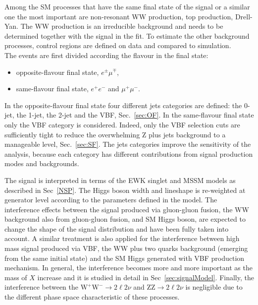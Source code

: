 Among the SM processes that have the same final state of the signal or a similar one the most important are non-resonant WW production, top production, Drell-Yan. The WW production is an irreducible background and needs to be determined together with the signal in the fit. To estimate the other background processes, control regions are defined on data and compared to simulation. \\
The events are first divided according the flavour in the final state: 
\begin{itemize}
\item opposite-flavour final state, $e^{\pm} \mu^{\mp}$,
\item same-flavour final state, $e^+ e^-$ and  $\mu^+ \mu^-$. 
\end{itemize}
In the opposite-flavour final state four different jets categories are defined: the 0-jet, the 1-jet, the 2-jet and the VBF, Sec.~\ref{sec:OF}. 
In the same-flavour final state only the VBF category is considered. Indeed, only the VBF selection cuts are sufficiently tight to reduce the  overwhelming Z plus jets background to a manageable level, Sec.~\ref{sec:SF}. The jets categories improve the sensitivity of the analysis, because each category has different contributions from signal production modes and backgrounds.

The signal is interpreted in terms of the EWK singlet and MSSM models as described in Sec~\ref{NSP}. The Higgs boson width and lineshape is re-weighted at generator level according to the parameters defined in the model. The interference effects between the signal produced via gluon-gluon fusion, the WW background also from gluon-gluon fusion, and SM Higgs boson, are expected to change the shape of the signal distribution and have been fully taken into account. 
A similar treatment is also applied for the interference between high mass signal produced via VBF, the WW plus two quarks background (emerging from the same initial state) and the SM Higgs generated with VBF production mechanism. In general, the interference becomes more and more important as the mass of $X$ increase and it is studied in detail in Sec~\ref{sec:signalModel}.
Finally, the interference between the $\mathrm{W^+W^-}\to2\ell2\nu$ and $\mathrm{ZZ}\to2\ell2\nu$ is negligible due to the different phase space characteristic of these processes.




